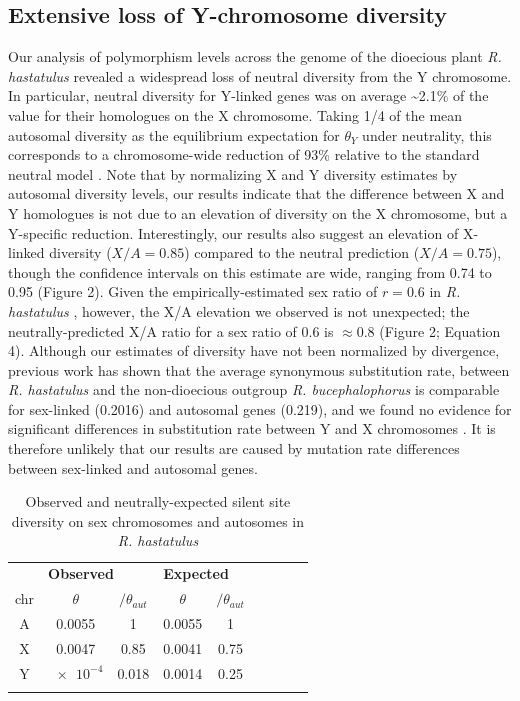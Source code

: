 \documentclass[9pt,twocolumn,twoside,lineno]{gsajnl}
\begin{document}
\subsection*{Extensive loss of Y-chromosome diversity}
Our analysis of polymorphism levels across the genome of the dioecious plant \textit{R. hastatulus} revealed a widespread loss of neutral diversity from the Y chromosome. In particular, neutral diversity for Y-linked genes was on average \textasciitilde 2.1\% of the value for their homologues on the X chromosome. Taking 1/4 of the mean autosomal diversity as the equilibrium expectation for $\theta_{Y}$ under neutrality, this corresponds to a chromosome-wide reduction of 93\% relative to the standard neutral model \citep{wright1931evolution}. Note that by normalizing X and Y diversity estimates by autosomal diversity levels, our results indicate that the difference between X and Y homologues is not due to an elevation of diversity on the X chromosome, but a Y-specific reduction. Interestingly, our results also suggest an elevation of X-linked diversity ($X/A=0.85$) compared to the neutral prediction ($X/A=0.75$), though the confidence intervals on this estimate are wide, ranging from 0.74 to 0.95 (Figure 2). Given the empirically-estimated sex ratio of $r=0.6$ in \textit{R. hastatulus} \citep{pickup2013influence}, however, the X/A elevation we observed is not unexpected; the neutrally-predicted X/A ratio for a sex ratio of 0.6 is $\approx 0.8$ (Figure 2; Equation 4). Although our estimates of diversity have not been normalized by divergence, previous work has shown that the average synonymous substitution rate, between \textit{R. hastatulus} and the non-dioecious outgroup \textit{R. bucephalophorus} is comparable for sex-linked (0.2016) and autosomal genes (0.219), and we found no evidence for significant differences in substitution rate between Y and X chromosomes \citep{hough2014}. It is therefore unlikely that our results are caused by mutation rate differences between sex-linked and autosomal genes.

\begin{table}[htb]
\centering
\caption{Observed and neutrally-expected silent site diversity on sex chromosomes and autosomes in \textit{R. hastatulus}}
\begin{tabular}{ccccccccc}
\textbf{} & \multicolumn{2}{l}{\textbf{Observed}} & \multicolumn{3}{l}{\textbf{Expected}} \\

chr & $\theta$ & $/\theta_{aut}$ & $\theta$ & $/\theta_{aut}$  \\
\midrule
A & 0.0055 & 1 & 0.0055 & 1 \\
X & 0.0047 & 0.85 & 0.0041 & 0.75 \\
Y & $\num{e-4}$ & 0.018 & 0.0014 & 0.25 \\
\addlinespace

\bottomrule
\end{tabular}
\end{table}
\end{document}
